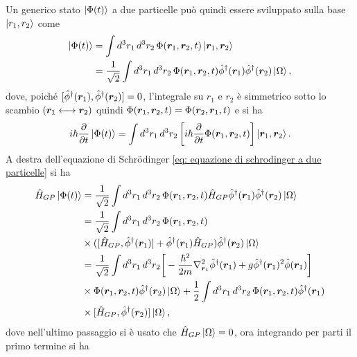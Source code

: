 Un generico stato $\ket{\Phi(t)}$ a due particelle può quindi essere sviluppato sulla base $\ket{r_1,r_2}$ come
\begin{equation}
    \begin{split}
        \ket{\Phi(t)} &= \int d^3r_1\,d^3r_2\, \Phi(\bm{r}_1,\bm{r}_2,t)\ket{\bm{r}_1,\bm{r}_2} \\
        &= \frac{1}{\sqrt{2}}\int d^3r_1\,d^3r_2\,\Phi(\bm{r}_1,\bm{r}_2,t)\hat{\phi}^\dagger(\bm{r}_1)\hat{\phi}^\dagger(\bm{r}_2)\ket{\Omega},
    \end{split}
\end{equation}
dove, poiché $[\hat{\phi}^\dagger(\bm{r}_1),\hat{\phi}^\dagger(\bm{r}_2)] = 0$, l'integrale su $r_1$ e $r_2$ è simmetrico sotto lo scambio $(\bm{r}_1 \longleftrightarrow \bm{r}_2)$ quindi $\Phi(\bm{r}_1,\bm{r}_2,t) = \Phi(\bm{r}_2,\bm{r}_1,t)$ e si ha
\begin{equation}
\label{eq: equazione di schrodinger a due particelle}
    i\hbar\frac{\partial}{\partial t}\ket{\Phi(t)} = \int d^3r_1\,d^3r_2\,\bigg[i\hbar\frac{\partial}{\partial t}\Phi(\bm{r}_1,\bm{r}_2,t)\bigg]\ket{\bm{r}_1,\bm{r}_2}.
\end{equation}
A destra dell'equazione di Schr\"odinger \eqref{eq: equazione di schrodinger a due particelle} si ha
\begin{equation}
    \begin{split}
        \hat{H}_{GP}\ket{\Phi(t)} &= \frac{1}{\sqrt{2}}\int d^3r_1\,d^3r_2\,\Phi(\bm{r}_1,\bm{r}_2,t)\hat{H}_{GP}\hat{\phi}^\dagger(\bm{r}_1)\hat{\phi}^\dagger(\bm{r}_2)\ket{\Omega} \\
        &= \frac{1}{\sqrt{2}}\int d^3r_1\,d^3r_2\,\Phi(\bm{r}_1,\bm{r}_2,t) \\ &\times([\hat{H}_{GP},\hat{\phi}^\dagger(\bm{r}_1)] + \hat{\phi}^\dagger(\bm{r}_1)\hat{H}_{GP})\hat{\phi}^\dagger(\bm{r}_2)\ket{\Omega} \\
        &= \frac{1}{\sqrt{2}}\int d^3r_1\,d^3r_2\bigg[-\frac{\hbar^2}{2m}\nabla^2_{\bm{r}_1}\hat{\phi}^\dagger(\bm{r}_1) + g\hat{\phi}^\dagger(\bm{r}_1)^2\hat{\phi}(\bm{r}_1)\bigg] \\
        &\times\Phi(\bm{r}_1,\bm{r}_2,t)\hat{\phi}^\dagger(\bm{r}_2)\ket{\Omega} + \frac{1}{2}\int d^3r_1\,d^3r_2\,\Phi(\bm{r}_1,\bm{r}_2,t)\hat{\phi}^\dagger(\bm{r}_1) \\
        &\times[\hat{H}_{GP},\hat{\phi}^\dagger(\bm{r}_2)]\ket{\Omega},
    \end{split}
\end{equation}
dove nell'ultimo passaggio si è usato che $\hat{H}_{GP}\ket{\Omega} = 0$, ora integrando per parti il primo termine si ha
